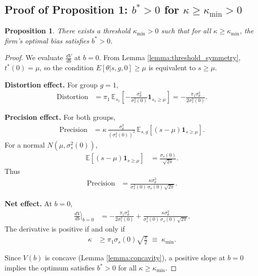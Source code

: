 \documentclass[12pt,a4paper]{article}
\newtheorem{proposition}{Proposition}
\theoremstyle{definition}
\theoremstyle{remark}
\begin{document}
\subsection{Proof of Proposition 1: $b^* > 0$ for $\kappa \geq \kappa_{\text{min}} > 0$}

\begin{proposition}
There exists a threshold $\kappa_{\min} > 0$ such that for all $\kappa \geq \kappa_{\min}$, the firm's optimal bias satisfies $b^* > 0$.
\end{proposition}

\begin{proof}
We evaluate $\frac{dV}{db}$ at $b=0$. From Lemma \ref{lemma:threshold_symmetry}, $t^*(0)=\mu$, so the condition $E[\theta|s,g,0] \ge \mu$ is equivalent to $s \ge \mu$.

\textbf{Distortion effect.} For group $g=1$,
\begin{align}
\text{Distortion} &= \pi_1 \, \mathbb{E}_{s_1}\left[-\frac{\sigma_\theta^2}{\sigma_s^2(0)} \mathbf{1}_{s_1 \ge \mu}\right] = -\frac{\pi_1 \sigma_\theta^2}{2\sigma_s^2(0)}.
\end{align}

\textbf{Precision effect.} For both groups,
\begin{align}
\text{Precision} &= \kappa \, \frac{\sigma_\theta^2}{(\sigma_s^2(0))^2} \, \mathbb{E}_{s,g}\!\left[(s-\mu)\mathbf{1}_{s \ge \mu}\right].
\end{align}
For a normal $N(\mu,\sigma_s^2(0))$, 
\begin{align}
\mathbb{E}[(s-\mu)\mathbf{1}_{s \ge \mu}] &= \frac{\sigma_s(0)}{\sqrt{2\pi}}.
\end{align}
Thus
\begin{align}
\text{Precision} &= \frac{\kappa \sigma_\theta^2}{\sigma_s^2(0)\,\sigma_s(0)\,\sqrt{2\pi}}.
\end{align}

\textbf{Net effect.} At $b=0$,
\begin{align}
\frac{dV}{db}\Big|_{b=0} &= -\frac{\pi_1 \sigma_\theta^2}{2\sigma_s^2(0)} + \frac{\kappa \sigma_\theta^2}{\sigma_s^2(0)\,\sigma_s(0)\,\sqrt{2\pi}}.
\end{align}
The derivative is positive if and only if
\begin{align}
\kappa &\geq \pi_1 \sigma_s(0) \sqrt{\tfrac{\pi}{2}} \;\equiv\; \kappa_{\min}.
\end{align}

Since $V(b)$ is concave (Lemma \ref{lemma:concavity}), a positive slope at $b=0$ implies the optimum satisfies $b^* > 0$ for all $\kappa \geq \kappa_{\min}$.
\end{proof}
\end{document}
